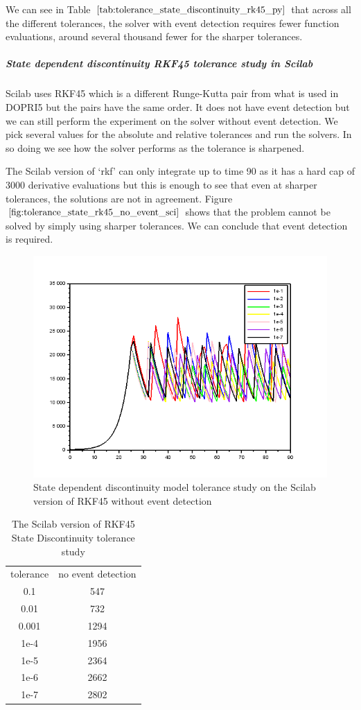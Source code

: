 We can see in Table $\ref{tab:tolerance_state_discontinuity_rk45_py}$ that across all the different tolerances, the solver with event detection requires fewer function evaluations, around several thousand fewer for the sharper tolerances. 

\subparagraph{State dependent discontinuity RKF45 tolerance study in Scilab}
Scilab uses RKF45 which is a different Runge-Kutta pair from what is used in DOPRI5 but the pairs have the same order. It does not have event detection but we can still perform the experiment on the solver without event detection. We pick several values for the absolute and relative tolerances and run the solvers. In so doing we see how the solver performs as the tolerance is sharpened. 

The Scilab version of `rkf' can only integrate up to time 90 as it has a hard cap of 3000 derivative evaluations but this is enough to see that even at sharper tolerances, the solutions are not in agreement. Figure $\ref{fig:tolerance_state_rk45_no_event_sci}$ shows that the problem cannot be solved by simply using sharper tolerances. We can conclude that event detection is required. 

\begin{figure}[h]
\centering
\includegraphics[width=0.7\linewidth]{./figures/tolerance_state_rk45_no_event_sci}
\caption{State dependent discontinuity model tolerance study on the Scilab version of RKF45 without event detection}
\label{fig:tolerance_state_rk45_no_event_sci}
\end{figure}

\begin{table}[h]
\caption {The Scilab version of RKF45 State Discontinuity tolerance study} \label{tab:tolerance_state_discontinuity_rk45_scilab} 
\begin{center}
\begin{tabular}{ c c }
tolerance & no event detection \\ 
0.1 & 547 \\
0.01 & 732 \\
0.001 & 1294 \\
1e-4 & 1956 \\
1e-5 & 2364 \\
1e-6 & 2662 \\
1e-7 & 2802 \\
\end{tabular}
\end{center}
\end{table}

